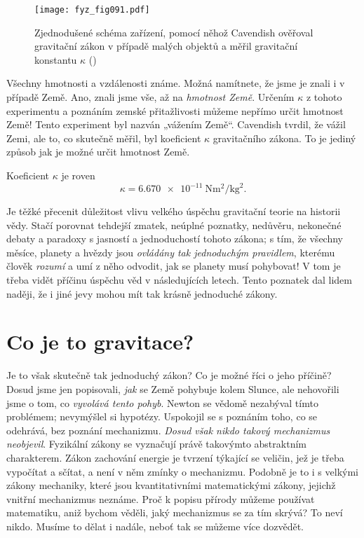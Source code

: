     \begin{figure}[ht!]  %
      \centering
      \texttt{[image: fyz\_fig091.pdf]}
      \caption{Zjednodušené schéma zařízení, pomocí něhož Cavendish ověřoval gravitační zákon v 
               případě malých objektů a měřil gravitační konstantu \(\kappa\)
               (\cite[s.~102]{Feynman01})}
      \label{fyz:fig091}
    \end{figure}
    Všechny hmotnosti a vzdálenosti známe. Možná namítnete, že jsme je znali i v případě Země. Ano, 
    znali jsme vše, až na \emph{hmotnost Země}. Určením \(\kappa\) z tohoto experimentu a poznáním 
    zemské přitažlivosti můžeme nepřímo určit hmotnost Země! Tento experiment byl nazván „vážením 
    Země“. Cavendish tvrdil, že vážil Zemi, ale to, co skutečně měřil, byl koeficient \(\kappa\) 
    gravitačního zákona. To je jediný způsob jak je možné určit hmotnost Země.
    
    Koeficient \(\kappa\) je roven 
    \begin{equation}\label{fyz:eq095}
      \kappa = \SI{6.670e-11}{\N\square\meter\per\square\kg}.
    \end{equation}
    
    Je těžké přecenit důležitost vlivu velkého úspěchu gravitační teorie na historii vědy. Stačí 
    porovnat tehdejší zmatek, neúplné poznatky, nedůvěru, nekonečné debaty a paradoxy s jasností a 
    jednoduchostí tohoto zákona; s tím, že všechny měsíce, planety a hvězdy jsou \emph{ovládány tak 
    jednoduchým pravidlem}, kterému člověk \emph{rozumí} a umí z něho odvodit, jak se planety musí 
    pohybovat! V tom je třeba vidět příčinu úspěchu věd v následujících letech. Tento poznatek dal 
    lidem naději, že i jiné jevy mohou mít tak krásně jednoduché zákony.
    
  \section{Co je to gravitace?}
    Je to však skutečně tak jednoduchý zákon? Co je možné říci o jeho příčině? Dosud jsme jen 
    popisovali, \emph{jak} se Země pohybuje kolem Slunce, ale nehovořili jsme o tom, co 
    \emph{vyvolává tento pohyb}. Newton se vědomě nezabýval tímto problémem; nevymýšlel si 
    hypotézy. Uspokojil se s poznáním toho, co se odehrává, bez poznání mechanizmu. \emph{Dosud 
    však nikdo takový mechanizmus neobjevil}. Fyzikální zákony se vyznačují právě takovýmto 
    abstraktním charakterem. Zákon zachování energie je tvrzení týkající se veličin, jež je třeba 
    vypočítat a sčítat, a není v něm zmínky o mechanizmu. Podobně je to i s velkými zákony 
    mechaniky, které jsou kvantitativními matematickými zákony, jejichž vnitřní mechanizmus 
    neznáme. Proč k popisu přírody můžeme používat matematiku, aniž bychom věděli, jaký mechanizmus 
    se za tím skrývá? To neví nikdo. Musíme to dělat i nadále, neboť tak se můžeme více dozvědět.
    

